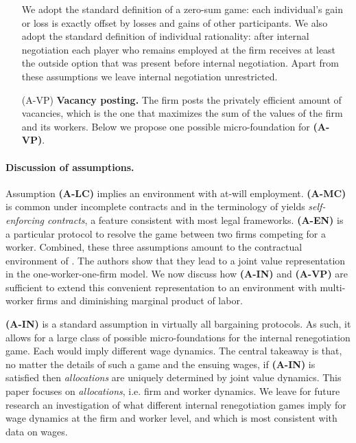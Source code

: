 \begin{enumerate}
{        We adopt the standard definition of a zero-sum game: each individual's gain or loss is exactly offset by losses and gains of other participants.
        We also adopt the standard definition of individual rationality: after internal negotiation each player who remains employed at the firm receives at least the outside option that was present before internal negotiation.}
    Apart from these assumptions we leave internal negotiation unrestricted.
\item[(A-VP)] \textbf{Vacancy posting.} The firm posts the privately efficient amount of vacancies, which is the one that maximizes the sum of the values of the firm and its workers. Below we propose one possible micro-foundation for \textbf{(A-VP)}.
\end{enumerate}

\paragraph{Discussion of assumptions.}

Assumption \textbf{(A-LC)} implies an environment with at-will employment. \textbf{(A-MC)} is common under incomplete contracts and in the terminology of \citet{macleod1989implicit} yields \emph{self-enforcing contracts}, a feature consistent with most legal frameworks. \textbf{(A-EN)} is a particular protocol to resolve the game between two firms competing for a worker. Combined, these three assumptions amount to the contractual environment of \citet{postelvinayrobin2002}. The authors show that they lead to a joint value representation in the one-worker-one-firm model. We now discuss how \textbf{(A-IN)} and \textbf{(A-VP)} are sufficient to extend this convenient representation to an environment with multi-worker firms and diminishing marginal product of labor.

\textbf{(A-IN)} is a standard assumption in virtually all bargaining protocols. As such, it allows for a large class of possible micro-foundations for the internal renegotiation game.
Each would imply different wage dynamics.
The central takeaway is that, no matter the details of such a game and the ensuing wages, if \textbf{(A-IN)} is satisfied then \textit{allocations} are uniquely determined by joint value dynamics.
This paper focuses on \textit{allocations}, i.e. firm and worker dynamics. We leave for future research an investigation of what different internal renegotiation games imply for wage dynamics at the firm and worker level, and which is most consistent with data on wages.

